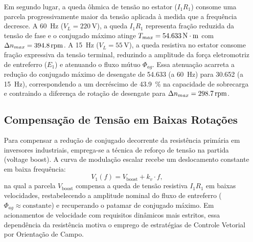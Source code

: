 Em segundo lugar, a queda ôhmica de tensão no estator ($I_1 R_1$) consome uma parcela progressivamente maior da tensão aplicada à medida que a frequência decresce. A \SI{60}{\hertz} ($V_L = \SI{220}{\volt}$), a queda $I_1 R_1$ representa fração reduzida da tensão de fase e o conjugado máximo atinge $T_{max} = \SI{54,633}{\mathrm{N\cdot m}}$ com $\Delta n_{max} = \SI{394,8}{\mathrm{rpm}}$. A \SI{15}{\hertz} ($V_L = \SI{55}{\volt}$), a queda resistiva no estator consome fração expressiva da tensão terminal, reduzindo a amplitude da força eletromotriz de entreferro ($E_1$) e atenuando o fluxo mútuo $\Phi_{ag}$. Essa atenuação acarreta a redução do conjugado máximo de desengate de \SI{54,633}{\Nm} (a \SI{60}{\hertz}) para \SI{30,652}{\Nm} (a \SI{15}{\hertz}), correspondendo a um decréscimo de \SI{43,9}{\percent} na capacidade de sobrecarga e contraindo a diferença de rotação de desengate para $\Delta n_{max} = \SI{298,7}{\mathrm{rpm}}$.

\subsection{Compensação de Tensão em Baixas Rotações}\label{subsec:voltage_boost}

Para compensar a redução de conjugado decorrente da resistência primária em inversores industriais, emprega-se a técnica de reforço de tensão na partida (voltage boost). A curva de modulação escalar recebe um deslocamento constante em baixa frequência:
\begin{equation}
V_1(f) = V_{\text{boost}} + k_v \cdot f,
\label{eq:voltage_boost_formula}
\end{equation}
na qual a parcela $V_{\text{boost}}$ compensa a queda de tensão resistiva $I_1 R_1$ em baixas velocidades, restabelecendo a amplitude nominal do fluxo de entreferro ($\Phi_{ag} \approx \text{constante}$) e recuperando o patamar de conjugado máximo. Em acionamentos de velocidade com requisitos dinâmicos mais estritos, essa dependência da resistência motiva o emprego de estratégias de Controle Vetorial por Orientação de Campo.
